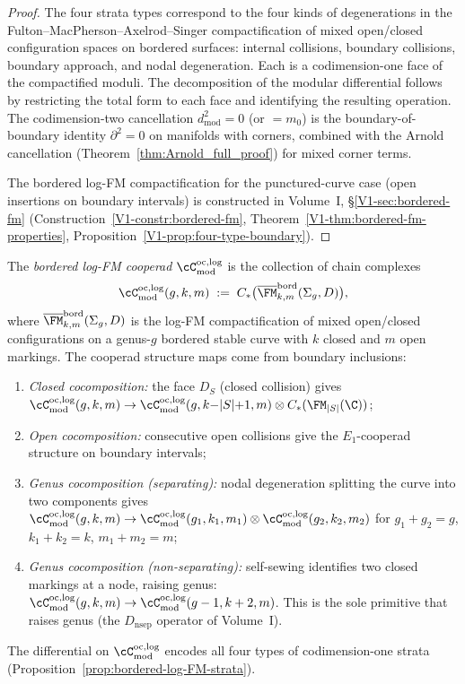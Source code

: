 \begin{proof}
The four strata types correspond to the four kinds of degenerations in the Fulton--MacPherson--Axelrod--Singer compactification of mixed open/closed configuration spaces on bordered surfaces: internal collisions, boundary collisions, boundary approach, and nodal degeneration. Each is a codimension-one face of the compactified moduli. The decomposition of the modular differential follows by restricting the total form to each face and identifying the resulting operation. The codimension-two cancellation $d_{\mathrm{mod}}^2 = 0$ (or $= m_0$) is the boundary-of-boundary identity $\partial^2 = 0$ on manifolds with corners, combined with the Arnold cancellation (Theorem~\ref{thm:Arnold_full_proof}) for mixed corner terms.

The bordered log-FM compactification for the punctured-curve case
(open insertions on boundary intervals) is constructed in Volume~I,
\S\ref*{V1-sec:bordered-fm}
(Construction~\ref*{V1-constr:bordered-fm},
Theorem~\ref*{V1-thm:bordered-fm-properties},
Proposition~\ref*{V1-prop:four-type-boundary}).
\end{proof}

\begin{definition}
\label{def:bordered-log-FM-cooperad}
The \emph{bordered log-FM cooperad} $\cC^{\mathrm{oc,log}}_{\mathrm{mod}}$ is the collection of chain complexes
\[
\cC^{\mathrm{oc,log}}_{\mathrm{mod}}(g, k, m) \;:=\; C_\ast\bigl(\overline{\FM}^{\mathrm{bord}}_{k,m}(\Sigma_g, D)\bigr),
\]
where $\overline{\FM}^{\mathrm{bord}}_{k,m}(\Sigma_g, D)$ is the log-FM compactification of mixed open/closed configurations on a genus-$g$ bordered stable curve with $k$ closed and $m$ open markings. The cooperad structure maps come from boundary inclusions:
\begin{enumerate}[label=\textup{(\roman*)}]
\item \emph{Closed cocomposition:} the face $D_S$ (closed collision) gives $\cC^{\mathrm{oc,log}}_{\mathrm{mod}}(g,k,m) \to \cC^{\mathrm{oc,log}}_{\mathrm{mod}}(g, k{-}|S|{+}1, m) \otimes C_\ast(\FM_{|S|}(\C))$;
\item \emph{Open cocomposition:} consecutive open collisions give the $E_1$-cooperad structure on boundary intervals;
\item \emph{Genus cocomposition (separating):} nodal degeneration splitting the curve into two components gives $\cC^{\mathrm{oc,log}}_{\mathrm{mod}}(g, k, m) \to \cC^{\mathrm{oc,log}}_{\mathrm{mod}}(g_1, k_1, m_1) \otimes \cC^{\mathrm{oc,log}}_{\mathrm{mod}}(g_2, k_2, m_2)$ for $g_1 + g_2 = g$, $k_1 + k_2 = k$, $m_1 + m_2 = m$;
\item \emph{Genus cocomposition (non-separating):} self-sewing identifies two closed markings at a node, raising genus: $\cC^{\mathrm{oc,log}}_{\mathrm{mod}}(g, k, m) \to \cC^{\mathrm{oc,log}}_{\mathrm{mod}}(g-1, k+2, m)$. This is the sole primitive that raises genus (the $D_{\mathrm{nsep}}$ operator of Volume~I).
\end{enumerate}
The differential on $\cC^{\mathrm{oc,log}}_{\mathrm{mod}}$ encodes all four types of codimension-one strata (Proposition~\ref{prop:bordered-log-FM-strata}).
\end{definition}

